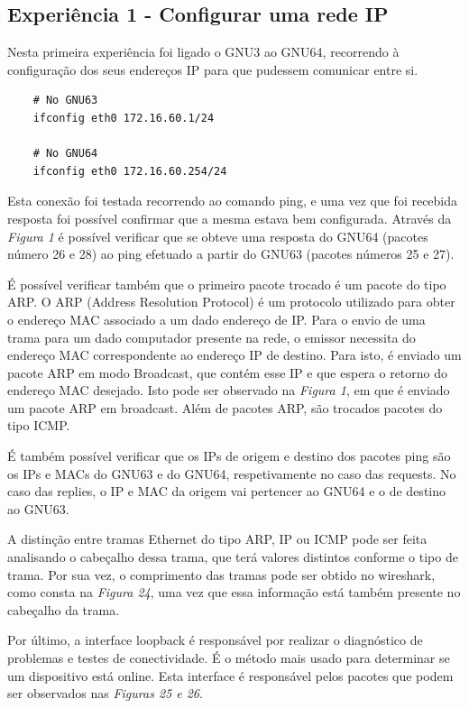 \documentclass[article, a4paper, 11pt, oneside]{memoir}
\begin{document}
\subsection{Experiência 1 - Configurar uma rede IP}

Nesta primeira experiência foi ligado o GNU3 ao GNU64, recorrendo à configuração dos seus endereços IP para que pudessem comunicar entre si. 
\begin{lstlisting}
	# No GNU63
	ifconfig eth0 172.16.60.1/24

	# No GNU64
	ifconfig eth0 172.16.60.254/24
\end{lstlisting} 

Esta conexão foi testada recorrendo ao comando ping, e uma vez que foi recebida resposta foi possível confirmar que a mesma estava bem configurada. 
Através da \emph{Figura 1} é possível verificar que se obteve uma resposta do GNU64 (pacotes número 26 e 28) ao ping efetuado a partir do GNU63
(pacotes números 25 e 27).

É possível verificar também que o primeiro pacote trocado é um pacote do tipo ARP. 
O ARP (Address Resolution Protocol) é um protocolo utilizado para obter o endereço MAC associado
a um dado endereço de IP. Para o envio de uma trama para um dado computador presente na rede, o emissor
necessita do endereço MAC correspondente ao endereço IP de destino. Para isto, é enviado um pacote ARP
em modo Broadcast, que contém esse IP e que espera o retorno do endereço MAC desejado.
Isto pode ser observado na \emph{Figura 1}, em que é enviado um pacote ARP em broadcast.
Além de pacotes ARP, são trocados pacotes do tipo ICMP.

É também possível verificar que os IPs de origem e destino dos pacotes ping são os IPs e MACs do GNU63 e do GNU64, respetivamente no caso das requests.
No caso das replies, o IP e MAC da origem vai pertencer ao GNU64 e o de destino ao GNU63.

A distinção entre tramas Ethernet do tipo ARP, IP ou ICMP pode ser feita analisando o cabeçalho dessa trama, que terá valores distintos conforme o tipo de trama.
Por sua vez, o comprimento das tramas pode ser obtido no wireshark, como consta na \emph{Figura 24}, uma vez que essa informação está também presente no cabeçalho da trama.

Por último, a interface loopback é responsável por realizar o diagnóstico de problemas e testes de conectividade.
É o método mais usado para determinar se um dispositivo está online. Esta interface é responsável pelos pacotes que podem
ser observados nas \emph{Figuras 25 e 26}.
\end{document}

